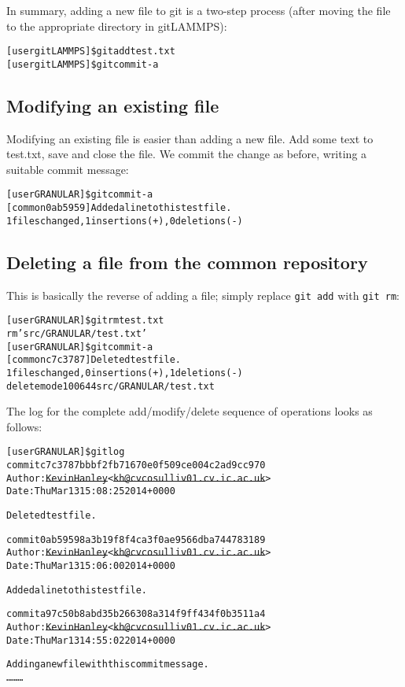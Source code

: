 \documentclass[a4paper,oneside,11pt]{article}
\begin{document}
In summary, adding a new file to git is a two-step process (after moving the file to the appropriate directory in gitLAMMPS):
\begin{alltt}
[user gitLAMMPS]\$ git add test.txt
[user gitLAMMPS]\$ git commit -a
\end{alltt}

\subsection{Modifying an existing file}
Modifying an existing file is easier than adding a new file. Add some text to test.txt, save and close the file. We commit the change as before, writing a suitable commit message:
\begin{alltt}
[user GRANULAR]\$ git commit -a
[common 0ab5959] Added a line to this test file.
 1 files changed, 1 insertions(+), 0 deletions(-)
\end{alltt}

\subsection{Deleting a file from the common repository}\label{ssec:dfcr}
This is basically the reverse of adding a file; simply replace \texttt{git add} with \texttt{git rm}:
\begin{alltt}
[user GRANULAR]\$ git rm test.txt
rm 'src/GRANULAR/test.txt'
[user GRANULAR]\$ git commit -a
[common c7c3787] Deleted test file.
 1 files changed, 0 insertions(+), 1 deletions(-)
 delete mode 100644 src/GRANULAR/test.txt
\end{alltt}

The log for the complete add\slash modify\slash delete sequence of operations looks as follows:
\begin{alltt}
[user GRANULAR]\$ git log
commit c7c3787bbbf2fb71670e0f509ce004c2ad9cc970
Author: \sout{Kevin Hanley} <\sout{kh@cvcosulliv01.cv.ic.ac.uk}>
Date:   Thu Mar 13 15:08:25 2014 +0000

    Deleted test file.

commit 0ab59598a3b19f8f4ca3f0ae9566dba744783189
Author: \sout{Kevin Hanley} <\sout{kh@cvcosulliv01.cv.ic.ac.uk}>
Date:   Thu Mar 13 15:06:00 2014 +0000

    Added a line to this test file.

commit a97c50b8abd35b266308a314f9ff434f0b3511a4
Author: \sout{Kevin Hanley} <\sout{kh@cvcosulliv01.cv.ic.ac.uk}>
Date:   Thu Mar 13 14:55:02 2014 +0000

    Adding a new file with this commit message.
\ldots\hspace*{10em}\ldots\hspace*{10em}\ldots
\end{alltt}
\end{document}
